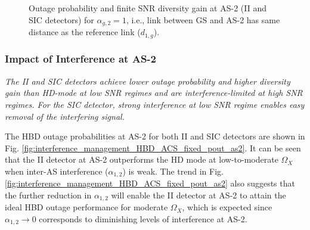 \begin{figure}[]
\centering
{}
\hfil
{}
\caption{Outage probability and finite SNR diversity gain at AS-2 (II and SIC detectors) for $\alpha_{g,2}=1$, i.e., link between GS and AS-2 has same distance as the reference link ($d_{1,g}$).}
\label{interference_management_HBD_ACS_fig_sim}
\end{figure}

\subsubsection{Impact of Interference at AS-2}

\begin{observation}
\emph{\emph{The II and SIC detectors achieve lower outage probability and higher diversity gain than HD-mode at low SNR regimes and are interference-limited at high SNR regimes. For the SIC detector, strong interference at low SNR regime enables easy removal of the interfering signal.}
}\end{observation}

The HBD outage probabilities at AS-2 for both II and SIC detectors are shown in Fig. \ref{fig:interference_management_HBD_ACS_fixed_pout_as2}. It can be seen that the II detector at AS-2 outperforms the HD mode at low-to-moderate $\Omega_X$ when inter-AS interference ($\alpha_{1,2}$) is weak. The trend in Fig. \ref{fig:interference_management_HBD_ACS_fixed_pout_as2} also suggests that the further reduction in $\alpha_{1,2}$ will enable the II detector at AS-2 to attain the ideal HBD outage performance for moderate $\Omega_X$, which is expected since $\alpha_{1,2}\to 0$ corresponds to diminishing levels of interference at AS-2. 

